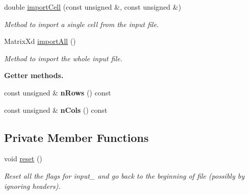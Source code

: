 \begin{DoxyCompactItemize}
double \hyperlink{classCsvParser_aaa5332e0ec78d1f38dd54240dcc728fe}{import\-Cell} (const unsigned \&, const unsigned \&)
\begin{DoxyCompactList}\small\item\em Method to import a single cell from the input file. \end{DoxyCompactList}\item 
Matrix\-Xd \hyperlink{classCsvParser_af4d7e0e1fe650b836e87387962297e86}{import\-All} ()
\begin{DoxyCompactList}\small\item\em Method to import the whole input file. \end{DoxyCompactList}\end{DoxyCompactItemize}
\begin{Indent}{\bf Getter methods.}\par
\begin{DoxyCompactItemize}
\item 
\hypertarget{classCsvParser_a97cc0c0da2b3691103450622dda2519a}{const unsigned \& {\bfseries n\-Rows} () const }\label{classCsvParser_a97cc0c0da2b3691103450622dda2519a}

\item 
\hypertarget{classCsvParser_a5de88cc09cb45066e7b6396b24d68a19}{const unsigned \& {\bfseries n\-Cols} () const }\label{classCsvParser_a5de88cc09cb45066e7b6396b24d68a19}

\end{DoxyCompactItemize}
\end{Indent}
\subsection*{Private Member Functions}
\begin{DoxyCompactItemize}
\item 
\hypertarget{classCsvParser_ad20897c5c8bd47f5d4005989bead0e55}{void \hyperlink{classCsvParser_ad20897c5c8bd47f5d4005989bead0e55}{reset} ()}\label{classCsvParser_ad20897c5c8bd47f5d4005989bead0e55}

\begin{DoxyCompactList}\small\item\em Reset all the flags for {\itshape input\-\_\-} and go back to the beginning of file (possibly by ignoring headers). \end{DoxyCompactList}\end{DoxyCompactItemize}
